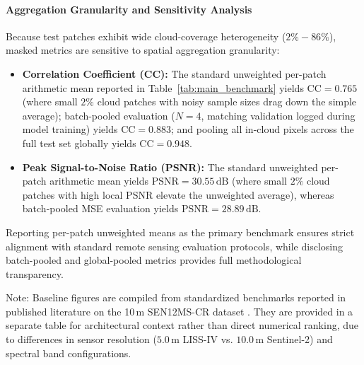 \paragraph{Aggregation Granularity and Sensitivity Analysis}
Because test patches exhibit wide cloud-coverage heterogeneity ($2\% - 86\%$), masked metrics are sensitive to spatial aggregation granularity:
\begin{itemize}
    \item \textbf{Correlation Coefficient (CC):} The standard unweighted per-patch arithmetic mean reported in Table~\ref{tab:main_benchmark} yields $\text{CC} = 0.765$ (where small $2\%$ cloud patches with noisy sample sizes drag down the simple average); batch-pooled evaluation ($N=4$, matching validation logged during model training) yields $\text{CC} = 0.883$; and pooling all in-cloud pixels across the full test set globally yields $\text{CC} = 0.948$.
    \item \textbf{Peak Signal-to-Noise Ratio (PSNR):} The standard unweighted per-patch arithmetic mean yields $\text{PSNR} = 30.55\,\text{dB}$ (where small $2\%$ cloud patches with high local PSNR elevate the unweighted average), whereas batch-pooled MSE evaluation yields $\text{PSNR} = 28.89\,\text{dB}$.
\end{itemize}
Reporting per-patch unweighted means as the primary benchmark ensures strict alignment with standard remote sensing evaluation protocols, while disclosing batch-pooled and global-pooled metrics provides full methodological transparency.

\begin{table}[!t]
\centering
\caption{Published Literature References on 10.0\,m SEN12MS-CR Benchmark (Provided for Architectural Context).}
\label{tab:literature_context}
\vspace{1mm}
\raggedright{\footnotesize Note: Baseline figures are compiled from standardized benchmarks reported in published literature on the 10\,m SEN12MS-CR dataset \cite{xu2022glf, li2024diffcr}. They are provided in a separate table for architectural context rather than direct numerical ranking, due to differences in sensor resolution ($5.0\,\text{m}$ LISS-IV vs. $10.0\,\text{m}$ Sentinel-2) and spectral band configurations.}
\end{table}

